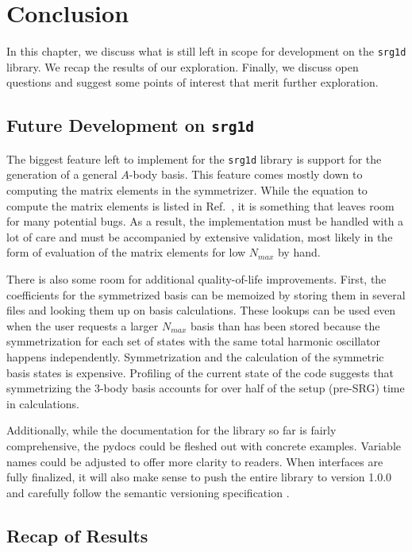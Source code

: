 \chapter{Conclusion}

In this chapter, we discuss what is still left in scope for development on the \texttt{srg1d} library. We recap the results of our exploration. Finally, we discuss open questions and suggest some points of interest that merit further exploration.

\section{Future Development on \texttt{srg1d}}

The biggest feature left to implement for the \texttt{srg1d} library is support for the generation of a general $A$-body basis. This feature comes mostly down to computing the matrix elements in the symmetrizer. While the equation to compute the matrix elements is listed in Ref.~\cite{Jurgenson:2008jp}, it is something that leaves room for many potential bugs. As a result, the implementation must be handled with a lot of care and must be accompanied by extensive validation, most likely in the form of evaluation of the matrix elements for low $N_{max}$ by hand.

There is also some room for additional quality-of-life improvements. First, the coefficients for the symmetrized basis can be memoized by storing them in several files and looking them up on basis calculations. These lookups can be used even when the user requests a larger $N_{max}$ basis than has been stored because the symmetrization for each set of states with the same total harmonic oscillator happens independently. Symmetrization and the calculation of the symmetric basis states is expensive. Profiling of the current state of the code suggests that symmetrizing the 3-body basis accounts for over half of the setup (pre-SRG) time in calculations.

Additionally, while the documentation for the library so far is fairly comprehensive, the pydocs could be fleshed out with concrete examples. Variable names could be adjusted to offer more clarity to readers. When interfaces are fully finalized, it will also make sense to push the entire library to version 1.0.0 and carefully follow the semantic versioning specification \cite{semver}.

\section{Recap of Results}

